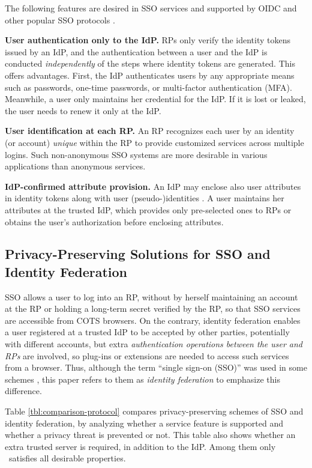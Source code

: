 The following features are desired in SSO services and supported by OIDC and other popular SSO protocols \cite{NIST2017draft, OpenIDConnect,rfc6749, SAML, SAMLIdentifier}.

\noindent\textbf{User authentication only to the IdP.}
RPs only verify the identity tokens issued by an IdP, and the authentication between a user and the IdP is conducted \emph{independently} of the steps where identity tokens are generated.
This offers advantages. First, the IdP authenticates users by any appropriate means such as passwords, one-time passwords, or multi-factor authentication (MFA).
Meanwhile, a user only maintains her credential for the IdP. If it is lost or leaked, the user needs to renew it only at the IdP.

\noindent \textbf{User identification at each RP.}
An RP recognizes each user by an identity (or account) \emph{unique} within the RP to provide customized services across multiple logins.
Such non-anonymous SSO systems are more desirable in various applications than anonymous services.

\noindent\textbf{IdP-confirmed attribute provision.}
An IdP may enclose also user attributes in identity tokens along with user (pseudo-)identities \cite{OpenIDConnect,rfc6749}.
A user maintains her attributes at the trusted IdP,
which provides only pre-selected ones to RPs
    or obtains the user's authorization before enclosing attributes.

\subsection{Privacy-Preserving Solutions for SSO and Identity Federation}
\label{subsec-solutions}


SSO allows a user to log into an RP, without by herself maintaining an account at the RP or holding a long-term secret verified by the RP,
so that SSO services are accessible from COTS browsers.
On the contrary, identity federation enables a user registered at a trusted IdP to be accepted by other parties, potentially with different accounts,
but extra \emph{authentication operations between the user and RPs} are involved, so plug-ins or extensions are needed to access such services from a browser.
Thus, although the term ``single sign-on (SSO)'' was used in some schemes \cite{PseudoID, Opaak, ELPASSO, WangWS13, HanCSTW18, HanCSTWW20}, this paper refers to them as \emph{identity federation} to emphasize this difference.

Table \ref{tbl:comparison-protocol} compares privacy-preserving schemes of SSO and identity federation,
        by analyzing whether a service feature is supported
                and whether a privacy threat is prevented or not.
This table also shows whether an extra trusted server is required, in addition to the IdP.
Among them only \usso\ satisfies all desirable properties.

